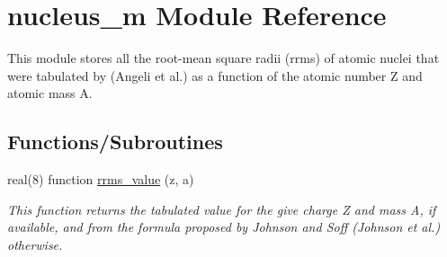 \hypertarget{namespacenucleus__m}{}\section{nucleus\+\_\+m Module Reference}
\label{namespacenucleus__m}


This module stores all the root-\/mean square radii (rrms) of atomic nuclei that were tabulated by (Angeli et al.) as a function of the atomic number Z and atomic mass A.  


\subsection*{Functions/\+Subroutines}
\begin{DoxyCompactItemize}
\item 
real(8) function \mbox{\hyperlink{namespacenucleus__m_a83e8714be10756711874d134c66bcf73}{rrms\+\_\+value}} (z, a)
\begin{DoxyCompactList}\small\item\em This function returns the tabulated value for the give charge Z and mass A, if available, and from the formula proposed by Johnson and Soff (Johnson et al.) otherwise. \end{DoxyCompactList}\end{DoxyCompactItemize}
